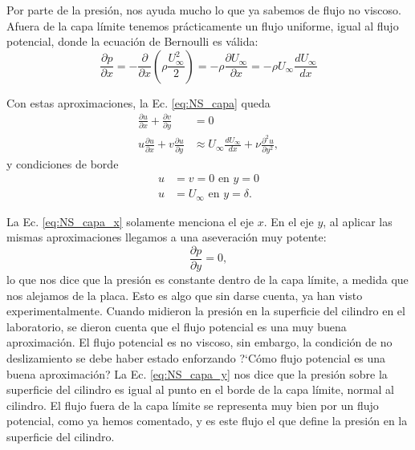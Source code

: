 Por parte de la presión, nos ayuda mucho lo que ya sabemos de flujo no viscoso. 
Afuera de la capa límite tenemos prácticamente un flujo uniforme, igual al flujo potencial, donde la ecuación de Bernoulli es válida:
%
\begin{equation}
\frac{\partial p}{\partial x} = -\frac{\partial}{\partial x}\left(\rho \frac{U_\infty^2}{2}\right) = - \rho\frac{\partial U_\infty}{\partial x} = -\rho U_\infty\frac{dU_\infty}{dx} 
\end{equation}

Con estas aproximaciones, la Ec. \eqref{eq:NS_capa} queda
%
\begin{align}\label{eq:NS_capa_x}
\frac{\partial u}{\partial x} + \frac{\partial v}{\partial y} &= 0 \nonumber\\
u\frac{\partial u}{\partial x} + v\frac{\partial u}{\partial y} &\approx U_\infty \frac{dU_\infty}{dx} + \nu \frac{\partial^2u}{\partial y^2},
\end{align}
%
y condiciones de borde
%
\begin{align}
u &= v = 0 \text{ en } y=0\nonumber\\
u &= U_\infty \text{ en } y=\delta.
\end{align}

La Ec. \eqref{eq:NS_capa_x} solamente menciona el eje $x$.
En el eje $y$, al aplicar las mismas aproximaciones llegamos a una aseveración muy potente:
%
\begin{equation}\label{eq:NS_capa_y}
\frac{\partial p}{\partial y} = 0,
\end{equation}
%
lo que nos dice que la presión es constante dentro de la capa límite, a medida que nos alejamos de la placa.
Esto es algo que sin darse cuenta, ya han visto experimentalmente.
Cuando midieron la presión en la superficie del cilindro en el laboratorio, se dieron cuenta que el flujo potencial es una muy buena aproximación.
El flujo potencial es no viscoso, sin embargo, la condición de no deslizamiento se debe haber estado enforzando \mbox{?`}Cómo flujo potencial es una buena aproximación?
La Ec. \eqref{eq:NS_capa_y} nos dice que la presión sobre la superficie del cilindro es igual al punto en el borde de la capa límite, normal al cilindro. 
El flujo fuera de la capa límite se representa muy bien por un flujo potencial, como ya hemos comentado, y es este flujo el que define la presión en la superficie del cilindro.

